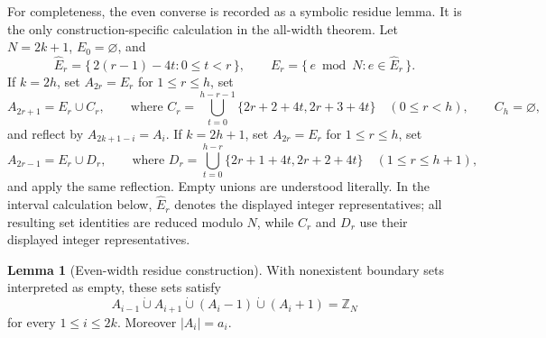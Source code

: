 \documentclass[11pt]{article}
\theoremstyle{definition}
\newtheorem{lemma}[theorem]{Lemma}
\begin{document}
For completeness, the even converse is recorded as a symbolic residue
lemma. It is the only construction-specific calculation in the
all-width theorem. Let \(N=2k+1\), \(E_0=\varnothing\), and
\[
 \widehat E_r=\{\,2(r-1)-4t:0\le t<r\,\},\qquad
 E_r=\{\,e\bmod N:e\in\widehat E_r\,\}.
\]
If \(k=2h\), set \(A_{2r}=E_r\) for \(1\le r\le h\), set
\[
A_{2r+1}=E_r\cup
C_r,\qquad
\text{where }C_r=\bigcup_{t=0}^{h-r-1}\{2r+2+4t,2r+3+4t\}
\quad(0\le r<h),\qquad C_h=\varnothing,
\]
and reflect by \(A_{2k+1-i}=A_i\). If \(k=2h+1\), set
\(A_{2r}=E_r\) for \(1\le r\le h\), set
\[
A_{2r-1}=E_r\cup
D_r,\qquad
\text{where }D_r=\bigcup_{t=0}^{h-r}\{2r+1+4t,2r+2+4t\}
\quad(1\le r\le h+1),
\]
and apply the same reflection. Empty unions are understood literally.
In the interval calculation below, \(\widehat E_r\) denotes the displayed
integer representatives; all resulting set identities are reduced modulo
\(N\), while \(C_r\) and \(D_r\) use their displayed integer representatives.

\begin{lemma}[Even-width residue construction]\label{lem:evenconstruction}
With nonexistent boundary sets interpreted as empty, these sets satisfy
\[
A_{i-1}\mathbin{\dot\cup}A_{i+1}
\mathbin{\dot\cup}(A_i-1)\mathbin{\dot\cup}(A_i+1)
=\mathbb Z_N                                                     \tag{3}
\]
for every \(1\le i\le2k\). Moreover
\(\lvert A_i\rvert=a_i\).
\end{lemma}
\end{document}
